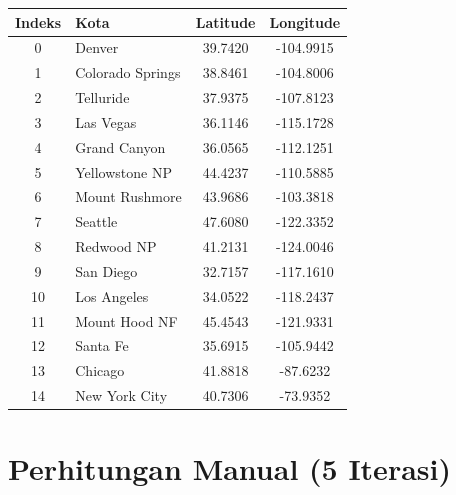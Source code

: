 \documentclass[12pt]{article}
\begin{document}
\begin{table}[h!]\centering
\begin{tabular}{clcc}
\toprule
\textbf{Indeks} & \textbf{Kota} & \textbf{Latitude} & \textbf{Longitude} \\
\midrule
0 & Denver & 39.7420 & -104.9915 \\
1 & Colorado Springs & 38.8461 & -104.8006 \\
2 & Telluride & 37.9375 & -107.8123 \\
3 & Las Vegas & 36.1146 & -115.1728 \\
4 & Grand Canyon & 36.0565 & -112.1251 \\
5 & Yellowstone NP & 44.4237 & -110.5885 \\
6 & Mount Rushmore & 43.9686 & -103.3818 \\
7 & Seattle & 47.6080 & -122.3352 \\
8 & Redwood NP & 41.2131 & -124.0046 \\
9 & San Diego & 32.7157 & -117.1610 \\
10 & Los Angeles & 34.0522 & -118.2437 \\
11 & Mount Hood NF & 45.4543 & -121.9331 \\
12 & Santa Fe & 35.6915 & -105.9442 \\
13 & Chicago & 41.8818 & -87.6232 \\
14 & New York City & 40.7306 & -73.9352 \\
\bottomrule
\end{tabular}
\end{table}


\section{Perhitungan Manual (5 Iterasi)}
\end{document}
